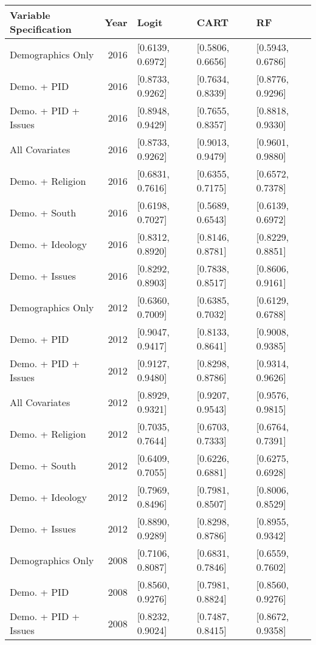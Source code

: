 \begin{longtable}{lrlll}
  \toprule
Variable Specification & Year & Logit & CART & RF \\ 
  \midrule
Demographics Only & 2016 & [0.6139, 0.6972] & [0.5806, 0.6656] & [0.5943, 0.6786] \\ 
  Demo. + PID & 2016 & [0.8733, 0.9262] & [0.7634, 0.8339] & [0.8776, 0.9296] \\ 
  Demo. + PID + Issues & 2016 & [0.8948, 0.9429] & [0.7655, 0.8357] & [0.8818, 0.9330] \\ 
  All Covariates & 2016 & [0.8733, 0.9262] & [0.9013, 0.9479] & [0.9601, 0.9880] \\ 
  Demo. + Religion & 2016 & [0.6831, 0.7616] & [0.6355, 0.7175] & [0.6572, 0.7378] \\ 
  Demo. + South & 2016 & [0.6198, 0.7027] & [0.5689, 0.6543] & [0.6139, 0.6972] \\ 
  Demo. + Ideology & 2016 & [0.8312, 0.8920] & [0.8146, 0.8781] & [0.8229, 0.8851] \\ 
  Demo. + Issues & 2016 & [0.8292, 0.8903] & [0.7838, 0.8517] & [0.8606, 0.9161] \\ 
  Demographics Only & 2012 & [0.6360, 0.7009] & [0.6385, 0.7032] & [0.6129, 0.6788] \\ 
  Demo. + PID & 2012 & [0.9047, 0.9417] & [0.8133, 0.8641] & [0.9008, 0.9385] \\ 
  Demo. + PID + Issues & 2012 & [0.9127, 0.9480] & [0.8298, 0.8786] & [0.9314, 0.9626] \\ 
  All Covariates & 2012 & [0.8929, 0.9321] & [0.9207, 0.9543] & [0.9576, 0.9815] \\ 
  Demo. + Religion & 2012 & [0.7035, 0.7644] & [0.6703, 0.7333] & [0.6764, 0.7391] \\ 
  Demo. + South & 2012 & [0.6409, 0.7055] & [0.6226, 0.6881] & [0.6275, 0.6928] \\ 
  Demo. + Ideology & 2012 & [0.7969, 0.8496] & [0.7981, 0.8507] & [0.8006, 0.8529] \\ 
  Demo. + Issues & 2012 & [0.8890, 0.9289] & [0.8298, 0.8786] & [0.8955, 0.9342] \\ 
  Demographics Only & 2008 & [0.7106, 0.8087] & [0.6831, 0.7846] & [0.6559, 0.7602] \\ 
  Demo. + PID & 2008 & [0.8560, 0.9276] & [0.7981, 0.8824] & [0.8560, 0.9276] \\ 
  Demo. + PID + Issues & 2008 & [0.8232, 0.9024] & [0.7487, 0.8415] & [0.8672, 0.9358] \\ 

\end{longtable}
